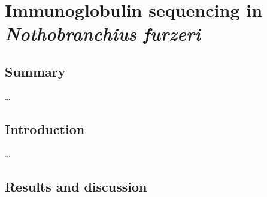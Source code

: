 
\chapter{Immunoglobulin sequencing in \textit{Nothobranchius furzeri}}  
\onehalfspacing

\section*{Summary} 

\dots
\pagebreak


\section{Introduction}

\dots







\section{Results and discussion}



